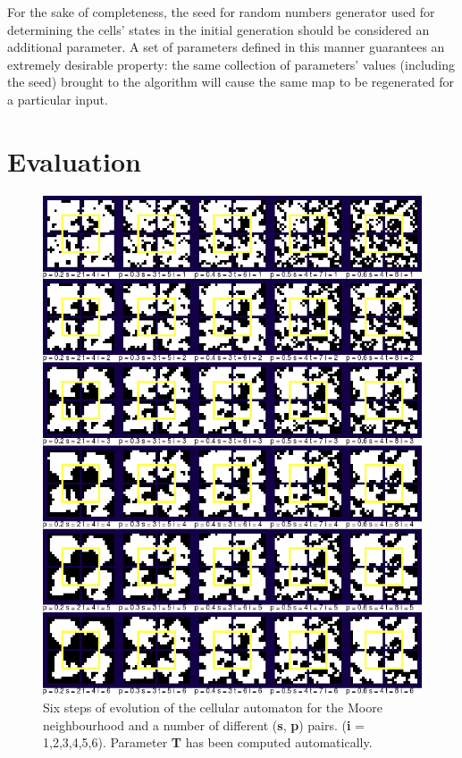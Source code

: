 \documentclass[a4paper, 11pt]{article} %
\begin{document}
For the sake of completeness, the seed for random numbers generator used for determining the cells' states in the initial generation should be considered an additional parameter. A set of parameters defined in this manner guarantees an extremely desirable property: the same collection of parameters' values (including the seed) brought to the algorithm will cause the same map to be regenerated for a particular input.


\section*{Evaluation}

\begin{figure}[ht]
	\centering
	\includegraphics[width=1.\textwidth]{moore_i}
	\caption{Six steps of evolution of the cellular automaton for the Moore neighbourhood and a number of different (\textbf{s}, \textbf{p}) pairs. (\textbf{i} = 1,2,3,4,5,6). Parameter \textbf{T} has been computed automatically.}
	\label{fig:results1}
\end{figure}
\end{document}
